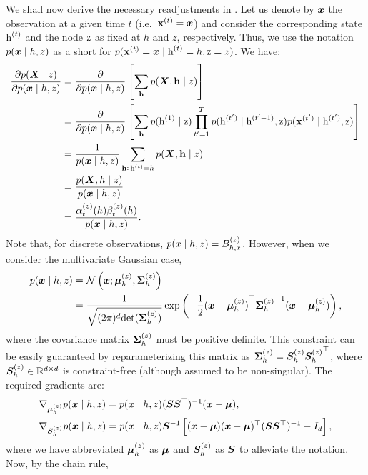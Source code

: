 We shall now derive the necessary readjustments in . Let us denote by ${\bm{x}}$ the observation at a given time $t$ (i.e.\ ${\mathbf{x}}^{(t)}={\bm{x}}$) and consider the corresponding state ${\textnormal{h}}^{(t)}$ and the node ${\textnormal{z}}$ as fixed at $h$ and $z$, respectively. Thus, we use the notation $p({\bm{x}} \mid h, z)$ as a short for $p({\mathbf{x}}^{(t)}={\bm{x}} \mid {\textnormal{h}}^{(t)}=h, {\textnormal{z}}=z)$. We have:
\begin{align}
    \frac{\partial p({\bm{X}} \mid z)}{\partial p({\bm{x}} \mid h, z)} &= \frac{\partial}{\partial p({\bm{x}} \mid h, z)} \left[\sum_{{\mathbf{h}}} p({\bm{X}}, {\mathbf{h}} \mid z)  \right] \nonumber\\
    &= \frac{\partial}{\partial p({\bm{x}} \mid h, z)} \left[\sum_{{\mathbf{h}}} p({\textnormal{h}}^{(1)} \mid {\textnormal{z}}) \prod_{t'=1}^T p({\textnormal{h}}^{(t')} \mid {\textnormal{h}}^{(t'-1)},{\textnormal{z}}) p({\mathbf{x}}^{(t')} \mid {\textnormal{h}}^{(t')},{\textnormal{z}})\right] \nonumber\\
    &= \frac{1}{p({\bm{x}} \mid h, z)} \sum_{{\mathbf{h}}:\, {\textnormal{h}}^{(t)}=h} p({\bm{X}}, {\mathbf{h}} \mid z) \nonumber\\
    &= \frac{p({\bm{X}}, h \mid z)}{p({\bm{x}} \mid h, z)} \nonumber\\
    &= \frac{\alpha_{t}^{(z)}(h) \beta_{t}^{(z)}(h)}{p({\bm{x}} \mid h, z)}.
\end{align}
Note that, for discrete observations, $p(x \mid h, z) = {B}^{(z)}_{h,x}$. However, when we consider the multivariate Gaussian case,
\begin{align}
    p({\bm{x}} \mid h, z) &= \mathcal{N}\left({\bm{x}}; {\bm{\mu}}^{(z)}_h, {\bm{\Sigma}}^{(z)}_h\right) \nonumber\\
    &= \frac{1}{\sqrt{(2\pi)^d \mathrm{det}({\bm{\Sigma}}^{(z)}_h)}} \exp \left(-\frac{1}{2} {({\bm{x}} - {\bm{\mu}}^{(z)}_h)}^\top {{\bm{\Sigma}}^{(z)}_h}^{-1} ({\bm{x}} - {\bm{\mu}}^{(z)}_h)\right),
\end{align}
where the covariance matrix ${\bm{\Sigma}}^{(z)}_h$ must be positive definite. This constraint can be easily guaranteed by reparameterizing this matrix as ${\bm{\Sigma}}^{(z)}_h = {\bm{S}}^{(z)}_h {{\bm{S}}^{(z)}_h}^\top$, where ${\bm{S}}^{(z)}_h \in {\mathbb{R}}^{d \times d}$ is constraint-free (although assumed to be non-singular). The required gradients are:
\begin{align}
    &\nabla_{{\bm{\mu}}^{(z)}_h} p({\bm{x}} \mid h, z) = p({\bm{x}} \mid h, z) ({\bm{S}} {\bm{S}}^\top)^{-1} ({\bm{x}} - {\bm{\mu}}), \\
    &\nabla_{{\bm{S}}^{(z)}_h} p({\bm{x}} \mid h, z) = p({\bm{x}} \mid h, z) {\bm{S}}^{-1} \left[ ({\bm{x}} - {\bm{\mu}}) ({\bm{x}} - {\bm{\mu}})^\top ({\bm{S}} {\bm{S}} ^\top)^{-1} - I_d\right],
\end{align}
where we have abbreviated ${\bm{\mu}}^{(z)}_h$ as ${\bm{\mu}}$ and ${\bm{S}}^{(z)}_h$ as ${\bm{S}}$ to alleviate the notation. Now, by the chain rule,
